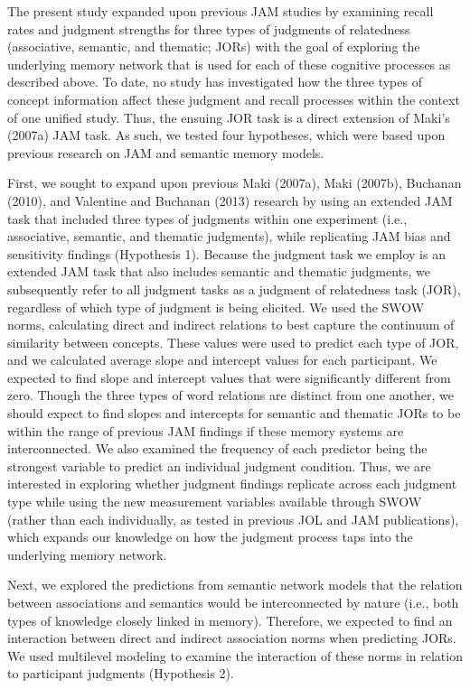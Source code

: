 \documentclass[english,,man]{apa6}
\begin{document}
The present study expanded upon previous JAM studies by examining recall rates and judgment strengths for three types of judgments of relatedness (associative, semantic, and thematic; JORs) with the goal of exploring the underlying memory network that is used for each of these cognitive processes as described above. To date, no study has investigated how the three types of concept information affect these judgment and recall processes within the context of one unified study. Thus, the ensuing JOR task is a direct extension of Maki's (2007a) JAM task. As such, we tested four hypotheses, which were based upon previous research on JAM and semantic memory models.

First, we sought to expand upon previous Maki (2007a), Maki (2007b), Buchanan (2010), and Valentine and Buchanan (2013) research by using an extended JAM task that included three types of judgments within one experiment (i.e., associative, semantic, and thematic judgments), while replicating JAM bias and sensitivity findings (Hypothesis 1). Because the judgment task we employ is an extended JAM task that also includes semantic and thematic judgments, we subsequently refer to all judgment tasks as a judgment of relatedness task (JOR), regardless of which type of judgment is being elicited. We used the SWOW norms, calculating direct and indirect relations to best capture the continuum of similarity between concepts. These values were used to predict each type of JOR, and we calculated average slope and intercept values for each participant. We expected to find slope and intercept values that were significantly different from zero. Though the three types of word relations are distinct from one another, we should expect to find slopes and intercepts for semantic and thematic JORs to be within the range of previous JAM findings if these memory systems are interconnected. We also examined the frequency of each predictor being the strongest variable to predict an individual judgment condition. Thus, we are interested in exploring whether judgment findings replicate across each judgment type while using the new measurement variables available through SWOW (rather than each individually, as tested in previous JOL and JAM publications), which expands our knowledge on how the judgment process taps into the underlying memory network.

Next, we explored the predictions from semantic network models that the relation between associations and semantics would be interconnected by nature (i.e., both types of knowledge closely linked in memory). Therefore, we expected to find an interaction between direct and indirect association norms when predicting JORs. We used multilevel modeling to examine the interaction of these norms in relation to participant judgments (Hypothesis 2).
\end{document}

